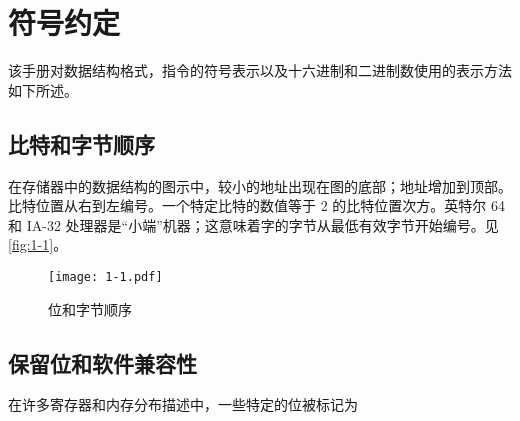 \section{符号约定}
该手册对数据结构格式，指令的符号表示以及十六进制和二进制数使用的表示方法如下所述。
\subsection{比特和字节顺序}
在存储器中的数据结构的图示中，较小的地址出现在图的底部；地址增加到顶部。比特位置从右到左编号。一个特定比特的数值等于 2 的比特位置次方。英特尔 64 和 IA-32 处理器是“小端”机器；这意味着字的字节从最低有效字节开始编号。见 \autoref{fig:1-1}。
\begin{figure}[H]
\centering
\texttt{[image: 1-1.pdf]}
\caption{位和字节顺序}
\label{fig:1-1}
\end{figure}

\subsection{保留位和软件兼容性}
在许多寄存器和内存分布描述中，一些特定的位被标记为